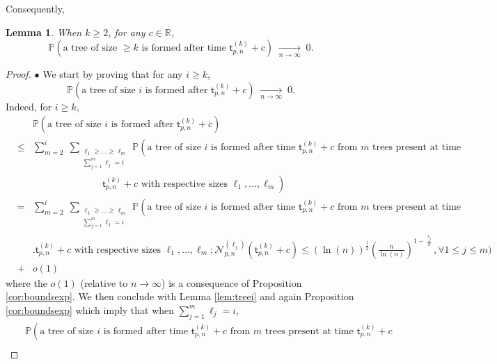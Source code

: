 \documentclass[a4, 11pt]{article}
\numberwithin{equation}{section}
\theoremstyle{plain}
\newtheorem{lemma}[theorem]{Lemma}
\theoremstyle{definition}
\theoremstyle{remark}
\begin{document}
Consequently,

\begin{lemma} 
\label{lem:formation}
When $k\geq 2$, for any $c \in \mathbb R$,
$$
\mathbb P \left(\text{a tree of size $\geq k$ is formed after time }\mathsf t^{(k)}_{p,n} +c \right)  \; \underset{n \rightarrow \infty}{\longrightarrow} \; 0.
$$
\end{lemma}

\begin{proof}
$\bullet$ We start by proving that for any $i \geq k$,
\begin{equation}
\label{cv:uni}
\mathbb P \left(\text{a tree of size $i$ is formed after }\mathsf t^{(k)}_{p,n} +c \right)  \; \underset{n \rightarrow \infty}{\longrightarrow} \; 0.
\end{equation}
Indeed, for $i \geq k$, 
\begin{eqnarray*}
&& \mathbb P \left(\text{a tree of size $i$ is formed after }\mathsf t^{(k)}_{p,n} +c \right) \\
&\leq & \sum_{m=2}^i \; \sum_{\substack{\ell_1 \geq \ldots \geq \ell_m \\\sum_{j=1}^m \ell_j=i}} \mathbb P \left(\text{a tree of size $i$ is formed after time }\mathsf t^{(k)}_{p,n} +c \text{ from $m$ trees present at time } \right.\\
&&  \left.  \hspace{3cm}  \mathsf t^{(k)}_{p,n} +c \text{ with respective sizes }\ell_1,\ldots,\ell_m\right) \\
&=& \sum_{m=2}^i \; \sum_{\substack{\ell_1 \geq \ldots \geq \ell_m \\\sum_{j=1}^m \ell_j=i}} \mathbb P \left(\text{a tree of size $i$ is formed after time }\mathsf t^{(k)}_{p,n} +c \text{ from $m$ trees present at time } \right.\\
&&  \Big.   \mathsf t^{(k)}_{p,n} +c \text{ with respective sizes }\ell_1,\ldots,\ell_m; \mathcal N_{p,n}^{(\ell_j)}(\mathsf t^{(k)}_{p,n} +c) \leq (\ln(n))^{\frac{1}{2}}\left(\frac{n}{\ln(n)}\right)^{1-\frac{\ell_j}{k}}, \forall 1\leq j \leq m\Big) \\
&+& o(1) 
\end{eqnarray*}
where the $o(1)$ (relative to $n\rightarrow \infty$) is a consequence of Proposition \ref{cor:boundsexp}. We then conclude with Lemma \ref{lem:treei} and again Proposition \ref{cor:boundsexp} which imply that when $\sum_{j=1}^m \ell_j=i$,
\begin{eqnarray*}
&& \mathbb P \left(\text{a tree of size $i$ is formed after time }\mathsf t^{(k)}_{p,n} +c \text{ from $m$ trees present at time } \mathsf t^{(k)}_{p,n} +c \right. \\ 

\end{eqnarray*}
\end{proof}
\end{document}
